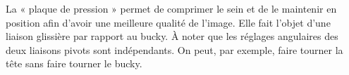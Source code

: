 La « plaque de pression » permet de comprimer le sein et de le maintenir en position afin d’avoir une meilleure qualité de l’image. Elle fait l’objet d’une liaison glissière par rapport au bucky.
À noter que les réglages angulaires des deux liaisons pivots sont indépendants. On peut, par exemple, faire
tourner la tête sans faire tourner le bucky.
%


%
\fi

\fi

